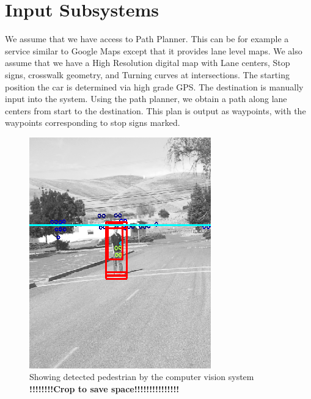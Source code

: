 \documentclass[letterpaper, 10 pt, conference]{ieeeconf}  %
\begin{document}
\section{Input Subsystems} \label{sec:inputsubsystems}

We assume that we have access to Path Planner. This can be for example a service similar to
Google Maps except that it provides lane level maps. We also assume that we have a High
Resolution digital map with Lane centers, Stop signs, crosswalk geometry, and Turning 
curves at intersections. The starting position the 
car is determined via high grade GPS. The destination is manually input into the system.
Using the path planner, we obtain a path along lane centers from start to the destination.
This plan is output as waypoints, with the waypoints corresponding to stop signs marked.

\begin{figure}[thpb]
  \centering
  \includegraphics[width=0.5\columnwidth]{graphics/ped2.png}
  \caption{Showing detected pedestrian by the computer vision system
  \newline
  \textbf{!!!!!!!!Crop to save space!!!!!!!!!!!!!!!}
  }
  \label{fig:ped}
\end{figure}

\end{document}
